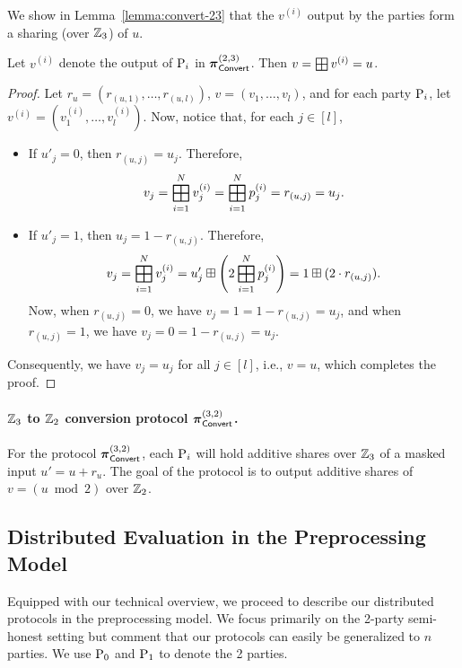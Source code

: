 \noindent We show in Lemma~\ref{lemma:convert-23} that the $v^{(i)}$ output by the parties form a sharing (over $\mathbb{Z}_3$) of $u$.

\begin{lemma}
Let $v^{(i)}$ denote the output of $\textnormal{P}_i$ in $\boldsymbol{\pi}_{\textsf{Convert}}^{(2,3)}$. Then $v = \bigboxplus v^{(i)} = u$.
\label{lemma:convert-23}
\end{lemma}
\begin{proof}
Let $r_u = (r_{(u,1)}, \dots, r_{(u,l)})$, $v = (v_1, \dots, v_l)$, and for each party $\textnormal{P}_i$, let $v^{(i)} = (v^{(i)}_1, \dots, v^{(i)}_l)$. Now, notice that, for each $j \in [l]$,
\begin{itemize}
    \item If $u'_j = 0$, then $r_{(u,j)} = u_j$. Therefore,
    \[
     v_j = \bigboxplus_{i=1}^N v^{(i)}_j = \bigboxplus_{i=1}^N p^{(i)}_j = r_{(u,j)} = u_j.
    \]
    \item If $u'_j = 1$, then $u_j = 1 - r_{(u,j)}$. Therefore,
    \[
    v_j = \bigboxplus_{i=1}^N v^{(i)}_j = u'_j \boxplus \left(2\bigboxplus_{i=1}^N p^{(i)}_j \right) = 1 \boxplus (2 \cdot r_{(u,j)}).
    \]
    \noindent Now, when $r_{(u,j)} = 0$, we have $v_j = 1 = 1 - r_{(u,j)} = u_j$, and when $r_{(u,j)} = 1$, we have $v_j = 0 = 1 - r_{(u,j)} = u_j$.
\end{itemize}
Consequently, we have $v_j = u_j$ for all $j \in [l]$, i.e., $v = u$, which completes the proof.
\end{proof}

\paragraph{$\mathbb{Z}_3$ to $\mathbb{Z}_2$ conversion protocol $\boldsymbol{\pi}_{\textsf{Convert}}^{(3,2)}$.}
For the protocol $\boldsymbol{\pi}_{\textsf{Convert}}^{(3,2)}$, each $\textnormal{P}_i$ will hold additive shares over $\mathbb{Z}_3$ of a masked input $u' = u + r_u$. The goal of the protocol is to output additive shares of $v = (u \bmod 2)$ over $\mathbb{Z}_2$.


\subsection{Distributed Evaluation in the Preprocessing Model}\label{newProtocol}
Equipped with our technical overview, we proceed to describe our distributed protocols in the preprocessing model. We focus primarily on the 2-party semi-honest setting but comment that our protocols can easily be generalized to $n$ parties. We use $\textnormal{P}_0$ and $\textnormal{P}_1$ to denote the 2 parties.

